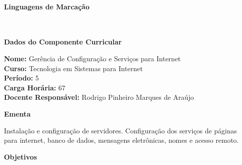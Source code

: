 \paragraph{Linguagens de Marcação} \


\begin{snugshade}\begin{center}\textbf{
    Dados do Componente Curricular
}\end{center}\end{snugshade}

\noindent \textbf{Nome:}                Gerência de Configuração e Serviços para Internet
\\        \textbf{Curso:}               Tecnologia em Sistemas para Internet
\\        \textbf{Período:}             \unit{5}{\degree}
\\        \textbf{Carga Horária:}       \unit{67}{\hour}
\\        \textbf{Docente Responsável:} Rodrigo Pinheiro Marques de Araújo


\begin{snugshade}\begin{center}\textbf{
    Ementa
\vphantom{q}}\end{center}\end{snugshade}

\noindent
Instalação e configuração de servidores. Configuração dos serviços de páginas para internet, banco de dados, mensagens eletrônicas, nomes e acesso remoto.


\begin{snugshade}\begin{center}\textbf{
    Objetivos
}\end{center}\end{snugshade}

